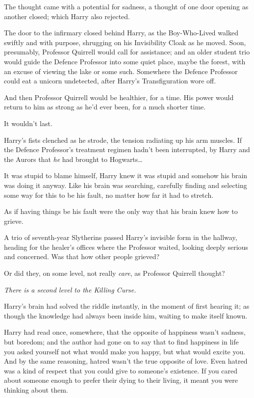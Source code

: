 The thought came with a potential for sadness, a thought of one door opening as another closed; which Harry also rejected.

\later

The door to the infirmary closed behind Harry, as the Boy-Who-Lived walked swiftly and with purpose, shrugging on his Invisibility Cloak as he moved. Soon, presumably, Professor Quirrell would call for assistance; and an older student trio would guide the Defence Professor into some quiet place, maybe the forest, with an excuse of viewing the lake or some such. Somewhere the Defence Professor could eat a unicorn undetected, after Harry's Transfiguration wore off.

And then Professor Quirrell would be healthier, for a time. His power would return to him as strong as he'd ever been, for a much shorter time.

It wouldn't last.

Harry's fists clenched as he strode, the tension radiating up his arm muscles. If the Defence Professor's treatment regimen hadn't been interrupted, by Harry and the Aurors that \emph{he} had brought to Hogwarts{\ldots}

It was stupid to blame himself, Harry knew it was stupid and somehow his brain was doing it anyway. Like his brain was searching, carefully finding and selecting some way for this to be his fault, no matter how far it had to stretch.

As if having things be his fault were the only way that his brain knew how to grieve.

A trio of seventh-year Slytherins passed Harry's invisible form in the hallway, heading for the healer's offices where the Professor waited, looking deeply serious and concerned. Was that how other people grieved?

Or did they, on some level, not really \emph{care}, as Professor Quirrell thought?

\emph{There is a second level to the Killing Curse.}

Harry's brain had solved the riddle instantly, in the moment of first hearing it; as though the knowledge had always been inside him, waiting to make itself known.

Harry had read once, somewhere, that the opposite of happiness wasn't sadness, but boredom; and the author had gone on to say that to find happiness in life you asked yourself not what would make you happy, but what would excite you. And by the same reasoning, hatred wasn't the true opposite of love. Even hatred was a kind of respect that you could give to someone's existence. If you cared about someone enough to prefer their dying to their living, it meant you were thinking about them.

